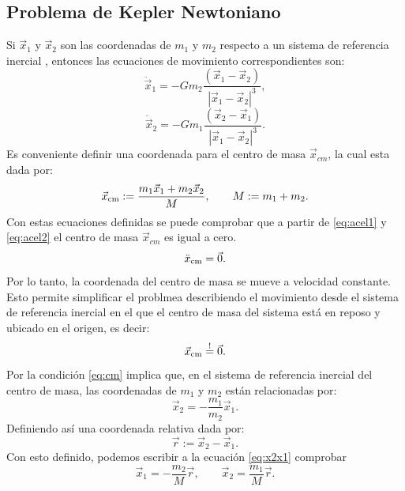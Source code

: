 \subsection{Problema de Kepler Newtoniano}
Si $\vec{x}_1$ y $\vec{x}_2$ son las coordenadas de $m_1$ y $m_2$ respecto a un sistema de referencia
inercial \cite{Wainmaier2011}, entonces las ecuaciones de movimiento correspondientes son:
\begin{equation}
\ddot{\vec{x}}_1=-Gm_2\frac{(\vec{x}_1-\vec{x}_2)}{|\vec{x}_1-\vec{x}_2|^3} ,\label{eq:acel1}
\end{equation}
\begin{equation}
\ddot{\vec{x}}_2=-Gm_1\frac{(\vec{x}_2-\vec{x}_1)}{|\vec{x}_1-\vec{x}_2|^3} .\label{eq:acel2}
\end{equation}
Es conveniente definir una coordenada para el centro de masa $\vec{x}_{cm}$, la cual esta dada por:
\begin{equation}
\vec{x}_{\rm cm}:=\frac{m_1\vec{x}_1+m_2\vec{x}_2}{M}, \qquad M:=m_1+m_2.
\end{equation}
Con estas ecuaciones definidas se puede comprobar que a partir de \ref{eq:acel1} y \ref{eq:acel2}  el centro de masa $\vec{x}_{cm}$ es igual a cero.
\begin{equation*}
    \ddot{x}_{\rm cm} = \vec{0}.
\end{equation*}
Por lo tanto, la coordenada del centro de masa se mueve a velocidad constante. Esto permite simplificar
el problmea describiendo el movimiento desde el sistema de referencia inercial en el que el centro de masa
del sistema está en reposo y ubicado en el origen, es decir:
\begin{equation}
    \vec{x}_{\rm cm}\stackrel{!}{=}\vec{0}. \label{eq:cm}
\end{equation}
Por la condición \ref{eq:cm} implica que, en el sistema de referencia inercial del centro de masa, las coordenadas
de $m_1$ y $m_2$ están relacionadas por:
\begin{equation}
    \vec{x}_2 = -\frac{m_1}{m_2} \vec{x}_1. \label{eq:x2x1}
\end{equation}
Definiendo así una coordenada relativa dada por:
\begin{equation}
    \vec{r}:= \vec{x}_2 - \vec{x}_1 \label{eq:r}.
\end{equation}
Con esto definido, podemos escribir a la ecuación \ref{eq:x2x1} comprobar
\begin{equation}\label{eq:x12fr}
    \vec{x}_1=-\frac{m_2}{M}\vec{r}, \qquad \vec{x}_2=\frac{m_1}{M}\vec{r}.
\end{equation}
